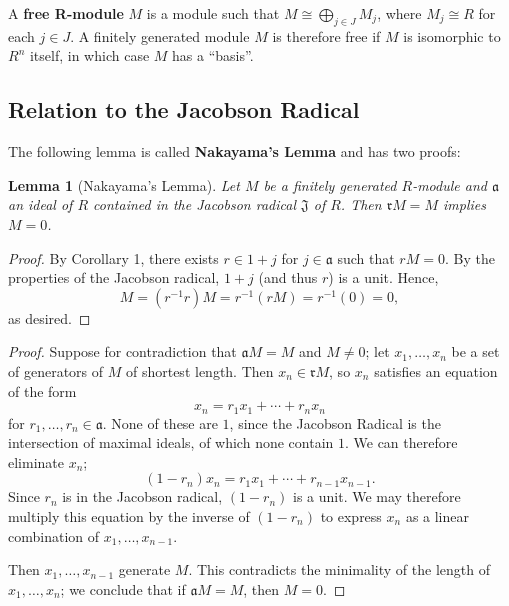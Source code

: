 \documentclass[11pt]{article}
\newtheorem{lemma}{Lemma}
\begin{document}
A \textbf{free R-module} $M$ is a module such that $M \cong \bigoplus_{j \in J} M_{j}$, where $M_{j} \cong R$ for each $j \in J$. A finitely generated module $M$ is therefore free if $M$ is isomorphic to $R^{n}$ itself, in which case $M$ has a ``basis''.

\subsection{Relation to the Jacobson Radical}


The following lemma is called \textbf{Nakayama's Lemma} and has two proofs:

\begin{adjustwidth}{1cm}{}
	\begin{lemma}[Nakayama's Lemma]
		Let $M$ be a finitely generated $R$-module and $\mathfrak{a}$ an ideal of $R$ contained in the Jacobson radical $\mathfrak{J}$ of $R$. Then $\mathfrak{r}M = M$ implies $M = 0$.
	\end{lemma}
	\begin{proof}
		By Corollary 1, there exists $r \in 1 + j$ for $j \in \mathfrak{a}$ such that $rM = 0$. By the properties of the Jacobson radical, $1 + j$ (and thus $r$) is a unit. Hence,
		\[
			M = (r^{-1}r)M = r^{-1}(rM) = r^{-1}(0) = 0,
		\]
		as desired.
	\end{proof}
	\begin{proof}
		Suppose for contradiction that $\mathfrak{a}M = M$ and $M \ne 0$; let $x_{1}, \ldots, x_{n}$ be a set of generators of $M$ of shortest length. Then $x_{n} \in \mathfrak{r}M$, so $x_{n}$ satisfies an equation of the form
		\[
			 x_{n} = r_{1} x_{1} + \cdots + r_{n} x_{n}
		\]
		for $r_{1}, \ldots, r_{n} \in \mathfrak{a}$. None of these are $1$, since the Jacobson Radical is the intersection of maximal ideals, of which none contain $1$. We can therefore eliminate $x_{n}$;
		\[
			(1 - r_{n})x_{n} = r_{1}x_{1} + \cdots + r_{n - 1}x_{n - 1}.
		\]
		Since $r_{n}$ is in the Jacobson radical, $(1 - r_{n})$ is a unit. We may therefore multiply this equation by the inverse of $(1 - r_{n})$ to express $x_{n}$ as a linear combination of $x_{1}, \ldots, x_{n - 1}$. 

		Then $x_{1}, \ldots, x_{n - 1}$ generate $M$. This contradicts the minimality of the length of $x_{1}, \ldots, x_{n}$; we conclude that if $\mathfrak{a} M = M$, then $M = 0$.
	\end{proof}
\end{adjustwidth}
\end{document}

